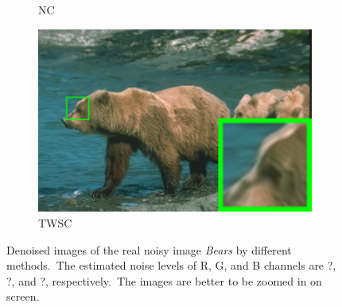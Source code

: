 \begin{figure}
\begin{subfigure}[t]{0.24\textwidth}
		\caption{NC}
    \end{subfigure}
    \hfill
    \begin{subfigure}[t]{0.24\textwidth}
        \centering
        \includegraphics[width=1\textwidth]{images/twsc/nc/resize_br_TWSC_bears.png}
		\caption{TWSC}
    \end{subfigure}
    \caption{Denoised images of the real noisy image \textsl{Bears} \cite{ncwebsite} by different methods.\ The estimated noise levels of R, G, and B channels are ?, ?, and ?, respectively.\ The images are better to be zoomed in on screen.}
    \label{fig5-8}
\end{figure}


